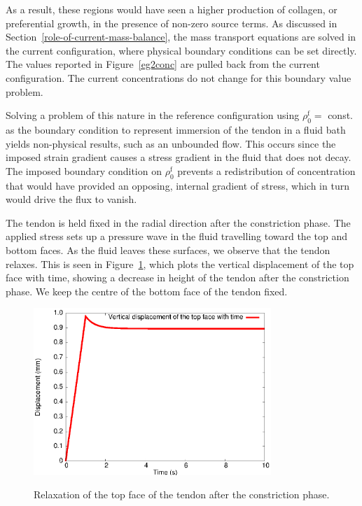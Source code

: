 As a result, these regions would have seen a higher production of
collagen, or preferential growth, in the presence of non-zero source
terms. As discussed in Section~\ref{role-of-current-mass-balance}, the
mass transport equations are solved in the current configuration,
where physical boundary conditions can be set directly. The values
reported in Figure~\ref{eg2conc} are pulled back from the current
configuration. The current concentrations do not change for this
boundary value problem.

Solving a problem of this nature in the
reference configuration using $\rho_0^\mathrm{f} = $ const. as the
boundary condition to represent immersion of the tendon in a fluid bath
yields non-physical results, such as an unbounded flow. This occurs
since the imposed strain gradient causes a stress gradient in the
fluid that does not decay. The imposed boundary condition on $\rho_0^\mathrm{f}$
prevents a redistribution of concentration that would have provided an
opposing, internal gradient of stress, which in turn would drive the
flux to vanish.


The tendon is held fixed in the radial direction after the
constriction phase. The applied stress sets up a pressure wave in the
fluid travelling toward the top and bottom faces. As the fluid leaves
these surfaces, we observe that the tendon relaxes. This is seen in
Figure~\ref{topdisp}, which plots the vertical displacement of the top
face with time, showing a decrease in height of the tendon after the
constriction phase. We keep the centre of the bottom face of the
tendon fixed.

\begin{figure}[!hpt]
  \centering
      {\includegraphics[width=0.8\textwidth]{images/examples/lagrangian/constriction/top-vertical-displacement}}
      \caption{Relaxation of the top face of the tendon after the
      constriction phase.}
      \label{topdisp}
\end{figure}

